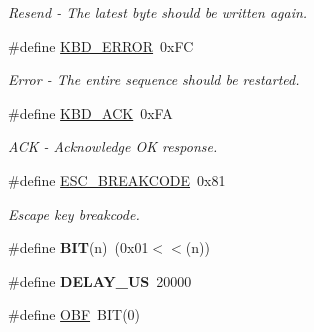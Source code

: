 \begin{DoxyCompactItemize}
\begin{DoxyCompactList}\small\item\em Resend -\/ The latest byte should be written again. \end{DoxyCompactList}\item 
\hypertarget{group__i8042_gaf4a366bf5be7f5777e06a0c684e4dac0}{\#define \hyperlink{group__i8042_gaf4a366bf5be7f5777e06a0c684e4dac0}{K\-B\-D\-\_\-\-E\-R\-R\-O\-R}~0x\-F\-C}\label{group__i8042_gaf4a366bf5be7f5777e06a0c684e4dac0}

\begin{DoxyCompactList}\small\item\em Error -\/ The entire sequence should be restarted. \end{DoxyCompactList}\item 
\hypertarget{group__i8042_gaed11128524b57808b87b21826713c1a7}{\#define \hyperlink{group__i8042_gaed11128524b57808b87b21826713c1a7}{K\-B\-D\-\_\-\-A\-C\-K}~0x\-F\-A}\label{group__i8042_gaed11128524b57808b87b21826713c1a7}

\begin{DoxyCompactList}\small\item\em A\-C\-K -\/ Acknowledge O\-K response. \end{DoxyCompactList}\item 
\hypertarget{group__i8042_ga69b1626cd295acf4cf3f8e284205b9db}{\#define \hyperlink{group__i8042_ga69b1626cd295acf4cf3f8e284205b9db}{E\-S\-C\-\_\-\-B\-R\-E\-A\-K\-C\-O\-D\-E}~0x81}\label{group__i8042_ga69b1626cd295acf4cf3f8e284205b9db}

\begin{DoxyCompactList}\small\item\em Escape key breakcode. \end{DoxyCompactList}\item 
\hypertarget{group__i8042_ga3a8ea58898cb58fc96013383d39f482c}{\#define {\bfseries B\-I\-T}(n)~(0x01$<$$<$(n))}\label{group__i8042_ga3a8ea58898cb58fc96013383d39f482c}

\item 
\hypertarget{group__i8042_ga1a522aa19bcb695a9df30032a893bee3}{\#define {\bfseries D\-E\-L\-A\-Y\-\_\-\-U\-S}~20000}\label{group__i8042_ga1a522aa19bcb695a9df30032a893bee3}

\item 
\hypertarget{group__i8042_ga45967c9e25447ba853cf6fb4ac545fe6}{\#define \hyperlink{group__i8042_ga45967c9e25447ba853cf6fb4ac545fe6}{O\-B\-F}~B\-I\-T(0)}\label{group__i8042_ga45967c9e25447ba853cf6fb4ac545fe6}


\end{DoxyCompactItemize}
